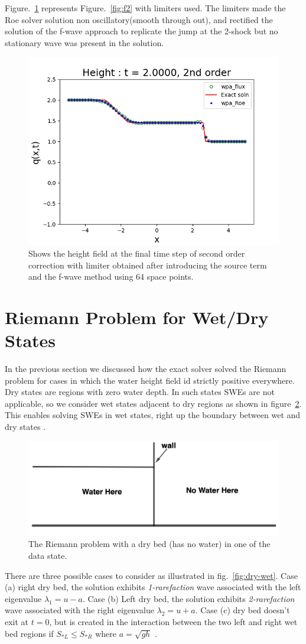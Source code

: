 \documentclass[12pt,a4paper]{article}
\newcommand{\donna}[1]{{\color{red}{#1}}}
\begin{document}
	Figure.~\ref{fig:f2lim} represents Figure.~\ref{fig:f2}  with limiters used. The limiters made the Roe solver solution non oscillatory(smooth through out), and rectified the solution of the f-wave approach to replicate the jump at the 2-shock but no stationary wave was present in the solution.
	\begin{figure}[H]
		\centering
		\includegraphics[width=0.5\linewidth]{images/2lim}
		\caption{Shows the height field at the final time step of second order correction with limiter obtained after introducing the source term and the f-wave method using 64 space points.}
		\label{fig:f2lim}
	\end{figure}
	\section{Riemann Problem for Wet/Dry States}
	
	
	In the previous section we discussed how the exact solver solved the Riemann problem for cases in which the water height field id strictly positive everywhere. Dry states are regions with zero water depth. In such states SWEs are not applicable, so we consider wet states adjacent to dry regions as shown in figure~\ref{fig:dry-bed}. This enables solving SWEs in wet states, right up the boundary between wet and dry states \citep{toro2001shock}.
	\begin{figure}[H]
		\centering
		\includegraphics[width=0.5\linewidth]{images/dd1}
		\caption{ The Riemann problem with a dry bed (has no water) in one of the data state.}
		\label{fig:dry-bed}
	\end{figure}
	There are three possible cases to consider as illustrated in fig.~\ref{fig:dry-wet}. Case (a) right dry bed, the solution exhibits {\em 1-rarefaction} wave associated with the left eigenvalue $\lambda_1 = u - a$. Case (b) Left dry bed, the solution exhibits {\em 2-rarefaction} wave associated with the right eigenvalue $\lambda_2 = u + a$. Case (c) dry bed doesn't exit at $t=0$, but is created in the interaction between the two left and right wet bed regions if $S_{*L} \le S_{*R}$ where $a = \sqrt{gh}$ \cite{toro2001shock}.
	
\end{document}
